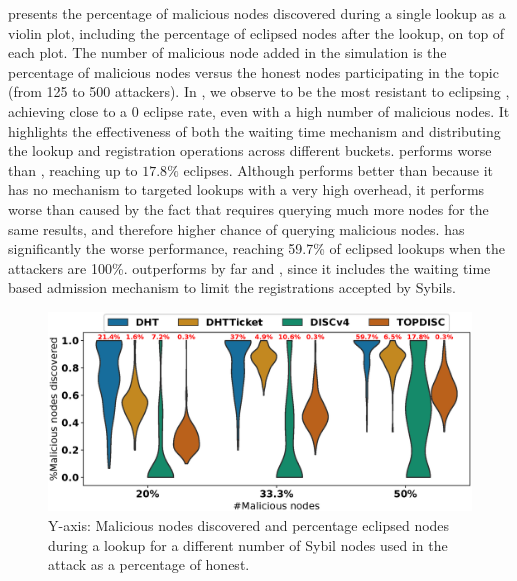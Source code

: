  presents the percentage of malicious nodes discovered during a single lookup as a violin plot,  including the percentage of eclipsed nodes after the lookup,  on top of each plot.
The number of malicious node added in the simulation is the percentage of malicious nodes versus the honest nodes participating in the topic (\ie from 125 to 500 attackers). 
In , we observe  \sysname to be the most resistant to eclipsing \sysname, achieving close to a $0$ eclipse rate, even with a high number of malicious nodes.  
It highlights the effectiveness of both the waiting time mechanism and distributing the lookup and registration operations across different buckets.
\discv performs worse than \sysname, reaching up to $17.8\%$ eclipses. Although performs better than \altname because it has no mechanism to targeted lookups with a very high overhead,  it performs worse than \sysname caused by the fact that \discv requires querying much more nodes for the same results, and therefore higher chance of querying malicious nodes.
\altname has  significantly the worse performance,  reaching  59.7\% of eclipsed lookups when the  attackers are 100\%.
\altnameticket outperforms by far \discv and \altname, since it includes the waiting time based admission mechanism to limit the registrations accepted by Sybils.
 
%

\begin{figure}[!h]
\includegraphics[width=\linewidth]{results/security/violin_percentEvil_percentageMaliciousDiscovered_t10.eps}
\caption{Y-axis: Malicious nodes discovered and percentage eclipsed nodes during a lookup for a different number of Sybil nodes used in the attack as a percentage of honest.}
\label{fig:eclipse_evil}
\end{figure}

